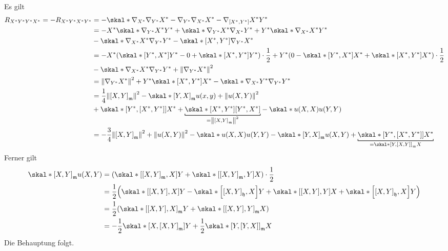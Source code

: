 \begin{beweis}
	Es gilt
	\begin{align}
		R_{X^*Y^*Y^*X^*} = - R_{X^*Y^*X^*Y^*} &= - \skal*{\nabla_{X^*} \nabla_{Y^*} X^* - \nabla_{Y^*} \nabla_{X^*} X^* - \nabla_{\benbrace*{X^*,Y^*}}X^*}{Y^*} \\
		&= - X^* \skal*{\nabla_{Y^*} X^*}{Y^*} + \skal*{\nabla_{Y^*} X^*}{\nabla_{X^*} Y^*} + Y^* \skal*{\nabla_{X^*} X^*}{Y^*} \\
		& - \skal*{\nabla_{X^*} X^*}{\nabla_{Y^*} Y^*} - \skal*{\benbrace*{X^*,Y^*}}{\nabla_{Y^*} X^*} \\
		&= - X^* \enbrace*{\skal*{\benbrace*{Y^*,X^*}}{Y^*} - 0+ \skal*{\benbrace*{X^*,Y^*}}{Y^*}} \cdot \frac{1}{2} + Y^* \enbrace*{0- \skal*{\benbrace*{Y^*,X^*}}{X^*} + \skal*{\benbrace*{X^*,Y^*}}{X^*}}  \cdot \frac{1}{2} \\
		& -\skal*{\nabla_{X^*} X^*}{\nabla_{Y^*} Y^*} + \norm*{\nabla_{Y^*} X^*}^2 \\
		&= \norm*{\nabla_{Y^*} X^*}^2 + Y^* \skal*{ \benbrace*{X^*,Y^*}}{X^*} - \skal*{\nabla_{X^*} Y^*}{\nabla_{Y^*} Y^*} \\
		&= \frac{1}{4} \norm*{\benbrace*{X,Y}_{\mathfrak{m}}}^2 - \skal*{\benbrace*{Y,X}_{\mathfrak{m}}}{u(x,y)} + \norm*{u(X,Y)}^2 \\
		& + \skal*{\benbrace*{Y^*, \benbrace*{X^*,Y^*}}}{X^*} + \Underbracket{\skal*{\benbrace*{X^*,Y^*}}{\benbrace*{Y^*,X^*}}}{=\norm*{\benbrace*{X,Y}_\mathfrak{m}}^2} - \skal*{u(X,X)}{u(Y,Y)} \\
		&= - \frac{3}{4} \norm*{\benbrace*{X,Y}_\mathfrak{m}}^2  + \norm*{u(X,Y)}^2 - \skal*{u(X,X)}{u(Y,Y)} - \skal*{\benbrace*{Y,X}_\mathfrak{m}}{u(X,Y)} + \Underbracket{\skal*{\benbrace*{Y^*, \benbrace*{X^*,Y^*}}}{X^*}}{= \skal*{\benbrace*{Y, \benbrace*{X,Y}}_\mathfrak{m}}{X}} 
	\end{align}
	Ferner gilt
	\begin{align}
		\skal*{\benbrace*{X,Y}_\mathfrak{m}}{u(X,Y)} &= \enbrace*{\skal*{\benbrace*{\benbrace*{X,Y}_\mathfrak{m},X}}{Y} + \skal*{\benbrace*{\benbrace*{X,Y}_\mathfrak{m},Y}}{X}} \cdot \frac{1}{2}  \\
		&= \frac{1}{2} \enbrace*{\skal*{\benbrace*{\benbrace*{X,Y},X}}{Y} - \skal*{\benbrace*{\benbrace*{X,Y}_\mathfrak{h},X}}{Y} + \skal*{\benbrace*{\benbrace*{X,Y},Y}}{X} + \skal*{\benbrace*{\benbrace*{X,Y}_\mathfrak{h},X}}{Y}}   \\
		&= \frac{1}{2} \enbrace*{\skal*{\benbrace*{\benbrace*{X,Y},X}_\mathfrak{m}}{Y} + \skal*{\benbrace*{\benbrace*{X,Y},Y}_\mathfrak{m}}{X}} \\
		&= -\frac{1}{2}  \skal*{\benbrace*{X,\benbrace*{X,Y}_\mathfrak{m}}}{Y} + \frac{1}{2} \skal*{\benbrace*{Y,\benbrace*{Y,X}}_\mathfrak{m}}{X} 
	\end{align}
	Die Behauptung folgt.
\end{beweis}

